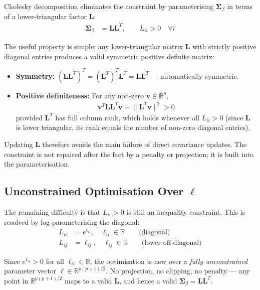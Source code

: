\documentclass[11pt,a4paper]{article}
\newcommand{\R}{\mathbb{R}}
\begin{document}
Cholesky decomposition eliminates the constraint by parameterising $\bm{\Sigma}_\beta$ in terms of a lower-triangular factor $\bm{L}$:
\begin{align}
  \bm{\Sigma}_\beta &= \bm{L}\bm{L}^T, \qquad L_{ii} > 0 \quad \forall i
\end{align}

The useful property is simple: any lower-triangular matrix $\bm{L}$ with strictly positive diagonal entries produces a valid symmetric positive definite matrix:

\begin{itemize}
  \item \textbf{Symmetry:} $(\bm{L}\bm{L}^T)^T = (\bm{L}^T)^T\bm{L}^T = \bm{L}\bm{L}^T$ \quad --- automatically symmetric.
  \item \textbf{Positive definiteness:} For any non-zero $\bm{v} \in \R^p$,
  \begin{align}
    \bm{v}^T \bm{L}\bm{L}^T \bm{v} = \|\bm{L}^T\bm{v}\|^2 > 0
  \end{align}
  provided $\bm{L}^T$ has full column rank, which holds whenever all $L_{ii} > 0$ (since $\bm{L}$ is lower triangular, its rank equals the number of non-zero diagonal entries).
\end{itemize}

Updating $\bm{L}$ therefore avoids the main failure of direct covariance updates. The constraint is not repaired after the fact by a penalty or projection; it is built into the parameterisation.

\subsection*{Unconstrained Optimisation Over $\bm{\ell}$}

The remaining difficulty is that $L_{ii} > 0$ is still an inequality constraint. This is resolved by log-parameterising the diagonal:
\begin{align}
  L_{ii} &= e^{\ell_{ii}}, \quad \ell_{ii} \in \R \qquad \text{(diagonal)}\\
  L_{ij} &= \ell_{ij}, \quad \ell_{ij} \in \R \qquad \text{(lower off-diagonal)}
\end{align}

Since $e^{\ell_{ii}} > 0$ for all $\ell_{ii} \in \R$, the optimisation is now over a \emph{fully unconstrained} parameter vector $\bm{\ell} \in \R^{p(p+1)/2}$. No projection, no clipping, no penalty --- any point in $\R^{p(p+1)/2}$ maps to a valid $\bm{L}$, and hence a valid $\bm{\Sigma}_\beta = \bm{L}\bm{L}^T$.
\end{document}
